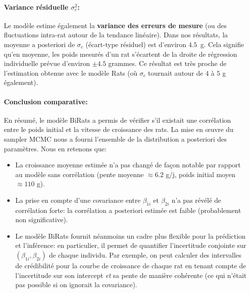 \documentclass[12pt]{article}
\begin{document}
\paragraph{Variance résiduelle $\sigma_c^2$:} Le modèle estime également la \textbf{variance des erreurs de mesure} (ou des fluctuations intra-rat autour de la tendance linéaire). Dans nos résultats, la moyenne a posteriori de $\sigma_c$ (écart-type résiduel) est d’environ $4.5$~g. Cela signifie qu’en moyenne, les poids mesurés d’un rat s’écartent de la droite de régression individuelle prévue d’environ $\pm4.5$ grammes. Ce résultat est très proche de l’estimation obtenue avec le modèle Rats (où $\sigma_c$ tournait autour de $4$ à $5$ g également). 

\paragraph{Conclusion comparative:} En résumé, le modèle BiRats a permis de vérifier s’il existait une corrélation entre le poids initial et la vitesse de croissance des rats. La mise en œuvre du sampler MCMC nous a fourni l’ensemble de la distribution a posteriori des paramètres. Nous en retenons que:
\begin{itemize}
    \item La croissance moyenne estimée n’a pas changé de façon notable par rapport au modèle sans corrélation (pente moyenne $\approx 6.2$ g/j, poids initial moyen $\approx 110$ g).
    \item La prise en compte d’une covariance entre $\beta_{1i}$ et $\beta_{2i}$ n’a pas révélé de corrélation forte: la corrélation a posteriori estimée est faible (probablement non significative).
    \item Le modèle BiRats fournit néanmoins un cadre plus flexible pour la prédiction et l’inférence: en particulier, il permet de quantifier l’incertitude conjointe sur $(\beta_{1i}, \beta_{2i})$ de chaque individu. Par exemple, on peut calculer des intervalles de crédibilité pour la courbe de croissance de chaque rat en tenant compte de l’incertitude sur son intercept \emph{et} sa pente de manière cohérente (ce qui n’était pas possible si on ignorait la covariance).
\end{itemize}
\end{document}
